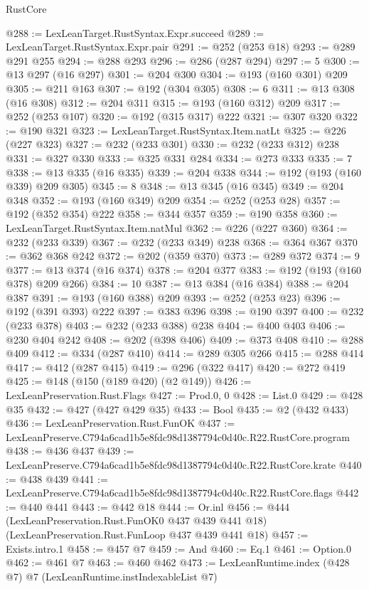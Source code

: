 \begin{lexlean}{RustCore}
\begin{coremodule}
@288 := LexLeanTarget.RustSyntax.Expr.succeed
@289 := LexLeanTarget.RustSyntax.Expr.pair
@291 := @252 (@253 @18)
@293 := @289 @291 @255
@294 := @288 @293
@296 := @286 (@287 @294)
@297 := 5
@300 := @13 @297 (@16 @297)
@301 := @204 @300
@304 := @193 (@160 @301) @209
@305 := @211 @163
@307 := @192 (@304 @305)
@308 := 6
@311 := @13 @308 (@16 @308)
@312 := @204 @311
@315 := @193 (@160 @312) @209
@317 := @252 (@253 @107)
@320 := @192 (@315 @317) @222
@321 := @307 @320
@322 := @190 @321
@323 := LexLeanTarget.RustSyntax.Item.natLt
@325 := @226 (@227 @323)
@327 := @232 (@233 @301)
@330 := @232 (@233 @312) @238
@331 := @327 @330
@333 := @325 @331 @284
@334 := @273 @333
@335 := 7
@338 := @13 @335 (@16 @335)
@339 := @204 @338
@344 := @192 (@193 (@160 @339) @209 @305)
@345 := 8
@348 := @13 @345 (@16 @345)
@349 := @204 @348
@352 := @193 (@160 @349) @209
@354 := @252 (@253 @28)
@357 := @192 (@352 @354) @222
@358 := @344 @357
@359 := @190 @358
@360 := LexLeanTarget.RustSyntax.Item.natMul
@362 := @226 (@227 @360)
@364 := @232 (@233 @339)
@367 := @232 (@233 @349) @238
@368 := @364 @367
@370 := @362 @368 @242
@372 := @202 (@359 @370)
@373 := @289 @372
@374 := 9
@377 := @13 @374 (@16 @374)
@378 := @204 @377
@383 := @192 (@193 (@160 @378) @209 @266)
@384 := 10
@387 := @13 @384 (@16 @384)
@388 := @204 @387
@391 := @193 (@160 @388) @209
@393 := @252 (@253 @23)
@396 := @192 (@391 @393) @222
@397 := @383 @396
@398 := @190 @397
@400 := @232 (@233 @378)
@403 := @232 (@233 @388) @238
@404 := @400 @403
@406 := @230 @404 @242
@408 := @202 (@398 @406)
@409 := @373 @408
@410 := @288 @409
@412 := @334 (@287 @410)
@414 := @289 @305 @266
@415 := @288 @414
@417 := @412 (@287 @415)
@419 := @296 (@322 @417)
@420 := @272 @419
@425 := @148 (@150 (@189 @420) (@2 @149))
@426 := LexLeanPreservation.Rust.Flags
@427 := Prod.{0, 0}
@428 := List.{0}
@429 := @428 @35
@432 := @427 (@427 @429 @35)
@433 := Bool
@435 := @2 (@432 @433)
@436 := LexLeanPreservation.Rust.FunOK
@437 := LexLeanPreserve.C794a6cad1b5e8fdc98d1387794c0d40c.R22.RustCore.program
@438 := @436 @437
@439 := LexLeanPreserve.C794a6cad1b5e8fdc98d1387794c0d40c.R22.RustCore.krate
@440 := @438 @439
@441 := LexLeanPreserve.C794a6cad1b5e8fdc98d1387794c0d40c.R22.RustCore.flags
@442 := @440 @441
@443 := @442 @18
@444 := Or.inl
@456 := @444
    (LexLeanPreservation.Rust.FunOK0 @437 @439 @441 @18)
    (LexLeanPreservation.Rust.FunLoop @437 @439 @441 @18)
@457 := Exists.intro.{1}
@458 := @457 @7
@459 := And
@460 := Eq.{1}
@461 := Option.{0}
@462 := @461 @7
@463 := @460 @462
@473 := LexLeanRuntime.index
    (@428 @7)
    @7
    (LexLeanRuntime.instIndexableList @7)

\end{coremodule}
\end{lexlean}
